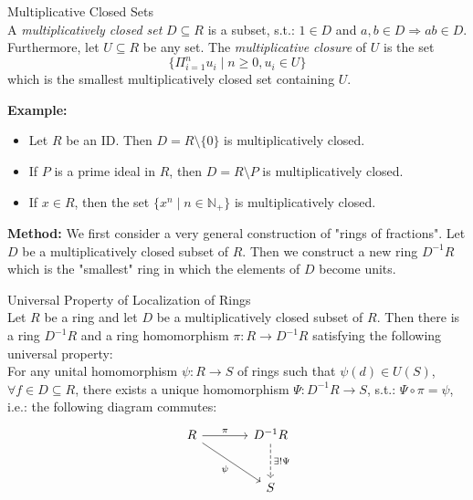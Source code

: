 \begin{definition}{Multiplicative Closed Sets}\\
A \textit{multiplicatively closed set} $D \subseteq R$ is a subset, s.t.: $1\in D$ and $a,b \in D \Rightarrow ab\in D$. Furthermore, let $U \subseteq R$ be any set. The \textit{multiplicative closure} of $U$ is the set
$$\{ \Pi_{i=1}^n u_i \mid n\geq 0, u_i\in U \}$$
which is the smallest multiplicatively closed set containing $U$.
\end{definition}

\noindent\textbf{Example:} \begin{itemize}
    \item Let $R$ be an ID. Then $D=R \setminus \{0\}$ is multiplicatively closed.
    \item If $P$ is a prime ideal in $R$, then $D=R \setminus P$ is multiplicatively closed.
    \item If $x\in R$, then the set $\{x^n \mid n\in \mathbb{N}_+\}$ is multiplicatively closed.
\end{itemize}

\noindent\textbf{Method:} We first consider a very general construction of "rings of fractions". Let $D$ be a multiplicatively closed subset of $R$. Then we construct a new ring $D^{-1}R$ which is the "smallest" ring in which the elements of $D$ become units.

\begin{theorem}{Universal Property of Localization of Rings}\\
Let $R$ be a ring and let $D$ be a multiplicatively closed subset of $R$. Then there is a ring $D^{-1}R$ and a ring homomorphism $\pi: R\to D^{-1}R$ satisfying the following universal property:\\
For any unital homomorphism $\psi: R\to S$ of rings such that $\psi(d) \in U(S)$, $\forall f\in D\subseteq R$, there exists a unique homomorphism $\Psi: D^{-1}R \to S$, s.t.: $\Psi \circ \pi= \psi$, i.e.: the following diagram commutes:
\[
\begin{tikzcd}[row sep=large, column sep=large]
    R \arrow[r, "\pi"] \arrow[dr, "\psi"'] & D^{-1}R \arrow[d, dashed, "\exists !\Psi"]\\
    &S
\end{tikzcd}
\]
\end{theorem}

